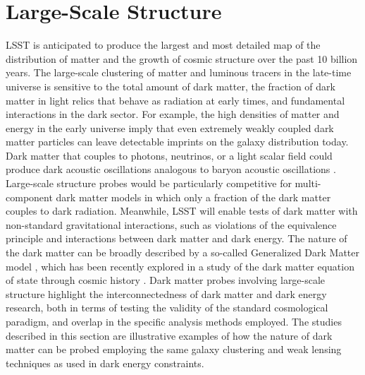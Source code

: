 \section{Large-Scale Structure }
\label{sec:lss}

LSST is anticipated to produce the largest and most detailed map of the distribution of matter and the growth of cosmic structure over the past 10 billion years. The large-scale clustering of matter and luminous tracers in the late-time universe is sensitive to the total amount of dark matter, the fraction of dark matter in light relics that behave as radiation at early times, and fundamental interactions in the dark sector. For example, the high densities of matter and energy in the early universe imply that even extremely weakly coupled dark matter particles can leave detectable imprints on the galaxy distribution today. Dark matter that couples to photons, neutrinos, or a light scalar field could produce dark acoustic oscillations analogous to baryon acoustic oscillations \citep{Cyr-Racine:2013fsa}. Large-scale structure probes would be particularly competitive for multi-component dark matter models in which only a fraction of the dark matter couples to dark radiation. Meanwhile, LSST will enable tests of dark matter with non-standard gravitational interactions, such as violations of the equivalence principle \citep{Bonvin:2018} and interactions between dark matter and dark energy. The nature of the dark matter can be broadly described by a so-called Generalized Dark Matter model \citep{Hu:1998}, which has been recently explored in a study of the dark matter equation of state through cosmic history \citep{Kopp:2018}. 
Dark matter probes involving large-scale structure highlight the interconnectedness of dark matter and dark energy research, both in terms of testing the validity of the standard cosmological paradigm, and overlap in the specific analysis methods employed. The studies described in this section are illustrative examples of how the nature of dark matter can be probed employing the same galaxy clustering and weak lensing techniques as used in dark energy constraints. 

